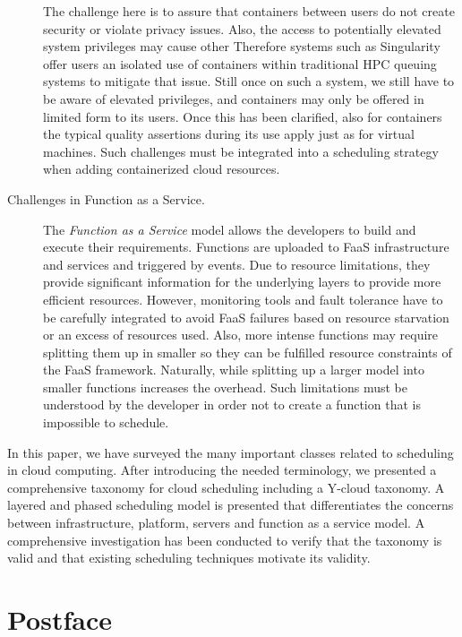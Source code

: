 \documentclass[final,5p,times,twocolumn]{elsarticle}
\begin{document}
\begin{description}
 The challenge here is to assure that containers between users do not create security or violate privacy issues. Also, the access to potentially elevated system privileges may cause other Therefore systems such as Singularity offer users an isolated use of containers within traditional HPC queuing systems to mitigate that issue. Still once on such a system, we still have to be aware of elevated privileges, and containers may only be offered in limited form to its users. Once this has been clarified, also for containers the typical quality assertions during its use apply just as for virtual machines. Such challenges must be integrated into a scheduling strategy when adding containerized cloud resources.


\item[Challenges in Function as a Service.] The {\em Function as a Service} model allows the developers to build and execute their requirements. Functions are uploaded to FaaS infrastructure and services and triggered by events. Due to resource limitations, they provide significant information for the underlying layers to provide more efficient resources. However, monitoring tools and fault tolerance have to be carefully integrated to avoid FaaS failures based on resource starvation or an excess of resources used. Also, more intense functions may require splitting them up in smaller so they can be fulfilled resource constraints of the FaaS framework. Naturally, while splitting up a larger model into smaller functions increases the overhead. Such limitations must be understood by the developer in order not to create a function that is impossible to schedule.

\end{description}

\color{black}

In this paper, we have surveyed the many important classes related to scheduling in cloud computing. After introducing the needed terminology, we presented a comprehensive taxonomy for cloud scheduling including a Y-cloud taxonomy. A layered and phased scheduling model is presented that differentiates the concerns between infrastructure, platform, servers and function as a service model. A comprehensive investigation has been conducted to verify that the taxonomy is valid and that existing scheduling techniques motivate its validity.



\section*{Postface}
\end{document}
